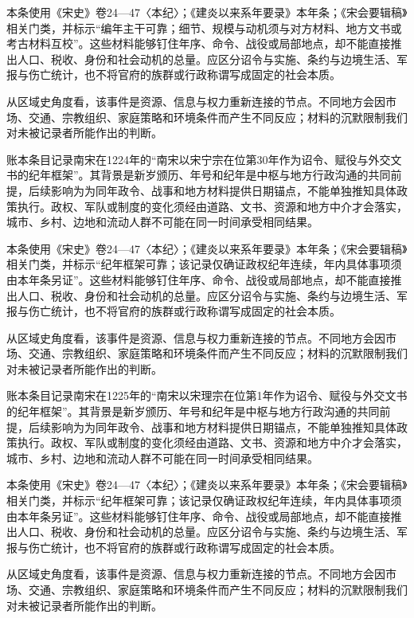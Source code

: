 本条使用《宋史》卷24—47〈本纪〉；《建炎以来系年要录》本年条；《宋会要辑稿》相关门类，并标示“编年主干可靠；细节、规模与动机须与对方材料、地方文书或考古材料互校”。这些材料能够钉住年序、命令、战役或局部地点，却不能直接推出人口、税收、身份和社会动机的总量。应区分诏令与实施、条约与边境生活、军报与伤亡统计，也不将官府的族群或行政称谓写成固定的社会本质。

从区域史角度看，该事件是资源、信息与权力重新连接的节点。不同地方会因市场、交通、宗教组织、家庭策略和环境条件而产生不同反应；材料的沉默限制我们对未被记录者所能作出的判断。

账本条目记录南宋在1224年的“南宋以宋宁宗在位第30年作为诏令、赋役与外交文书的纪年框架”。其背景是新岁颁历、年号和纪年是中枢与地方行政沟通的共同前提，后续影响为为同年政令、战事和地方材料提供日期锚点，不能单独推知具体政策执行。政权、军队或制度的变化须经由道路、文书、资源和地方中介才会落实，城市、乡村、边地和流动人群不可能在同一时间承受相同结果。

本条使用《宋史》卷24—47〈本纪〉；《建炎以来系年要录》本年条；《宋会要辑稿》相关门类，并标示“纪年框架可靠；该记录仅确证政权纪年连续，年内具体事项须由本年条另证”。这些材料能够钉住年序、命令、战役或局部地点，却不能直接推出人口、税收、身份和社会动机的总量。应区分诏令与实施、条约与边境生活、军报与伤亡统计，也不将官府的族群或行政称谓写成固定的社会本质。

从区域史角度看，该事件是资源、信息与权力重新连接的节点。不同地方会因市场、交通、宗教组织、家庭策略和环境条件而产生不同反应；材料的沉默限制我们对未被记录者所能作出的判断。

账本条目记录南宋在1225年的“南宋以宋理宗在位第1年作为诏令、赋役与外交文书的纪年框架”。其背景是新岁颁历、年号和纪年是中枢与地方行政沟通的共同前提，后续影响为为同年政令、战事和地方材料提供日期锚点，不能单独推知具体政策执行。政权、军队或制度的变化须经由道路、文书、资源和地方中介才会落实，城市、乡村、边地和流动人群不可能在同一时间承受相同结果。

本条使用《宋史》卷24—47〈本纪〉；《建炎以来系年要录》本年条；《宋会要辑稿》相关门类，并标示“纪年框架可靠；该记录仅确证政权纪年连续，年内具体事项须由本年条另证”。这些材料能够钉住年序、命令、战役或局部地点，却不能直接推出人口、税收、身份和社会动机的总量。应区分诏令与实施、条约与边境生活、军报与伤亡统计，也不将官府的族群或行政称谓写成固定的社会本质。

从区域史角度看，该事件是资源、信息与权力重新连接的节点。不同地方会因市场、交通、宗教组织、家庭策略和环境条件而产生不同反应；材料的沉默限制我们对未被记录者所能作出的判断。

